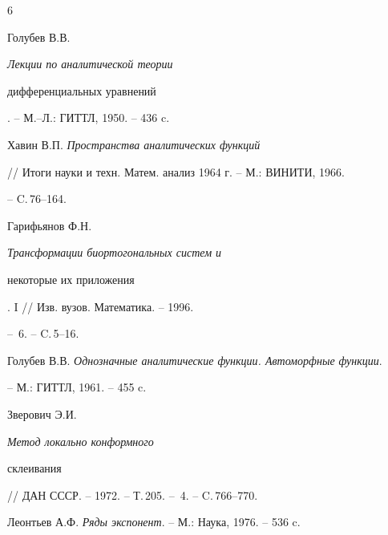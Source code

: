 \begin{thebibliography}{6}







Голубев В.В. {\em Лекции по аналитической теории


дифференциальных уравнений}. -- М.--Л.: ГИТТЛ, 1950. -- 436 c.




Хавин В.П. {\em Пространства аналитических функций}


// Итоги науки и техн. Матем. анализ 1964 г. -- М.: ВИНИТИ, 1966.


-- C.\,76--164.




Гарифьянов Ф.Н. {\em Трансформации биортогональных систем и


некоторые их приложения}. I // Изв. вузов. Математика. -- 1996.


-- \No\,6. -- C.\,5--16.




Голубев В.В. {\em Однозначные аналитические функции. Автоморфные функции}.


-- М.: ГИТТЛ, 1961. -- 455 c.




Зверович Э.И. {\em Метод локально конформного


склеивания} // ДАН СССР. -- 1972. -- Т.\,205. -- \No\,4. -- C.\,766--770.




Леонтьев А.Ф. {\em Ряды экспонент}. -- М.: Наука, 1976. -- 536 c.





\end{thebibliography}





\vskip 2cm












\label{end}





